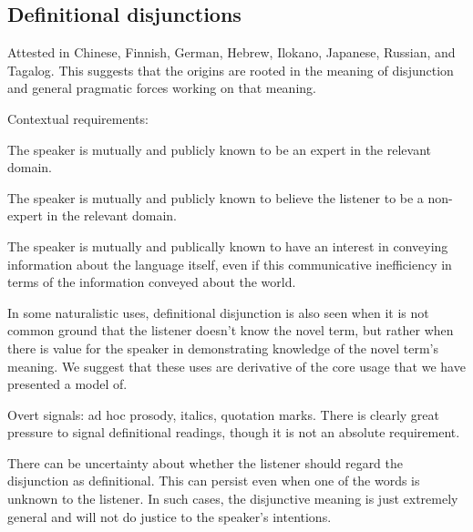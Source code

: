 \documentclass{article}
\begin{document}

\subsection{Definitional disjunctions}\label{sec:data:definitional}

\begin{examples}
\item Attested in Chinese, Finnish, German, Hebrew, Ilokano, Japanese,
  Russian, and Tagalog. This suggests that the origins are rooted in
  the meaning of disjunction and general pragmatic forces working on
  that meaning.

\item Contextual requirements: 

  \begin{examples}
  \item The speaker is mutually and publicly known to be an expert in
    the relevant domain.

  \item The speaker is mutually and publicly known to believe the
    listener to be a non-expert in the relevant domain.

  \item The speaker is mutually and publically known to have an
    interest in conveying information about the language itself,
    even if this communicative inefficiency in terms of the 
    information conveyed about the world.
  \end{examples}

\item In some naturalistic uses, definitional disjunction is also seen
  when it is not common ground that the listener doesn't know the
  novel term, but rather when there is value for the speaker in
  demonstrating knowledge of the novel term's meaning.  We suggest
  that these uses are derivative of the core usage that we have
  presented a model of.

\item Overt signals: ad hoc prosody, italics, quotation marks. There is
  clearly great pressure to signal definitional readings, though it is
  not an absolute requirement.

\item There can be uncertainty about whether the listener should
  regard the disjunction as definitional. This can persist even when
  one of the words is unknown to the listener. In such cases, the
  disjunctive meaning is just extremely general and will not do
  justice to the speaker's intentions.


\end{examples}
\end{document}
